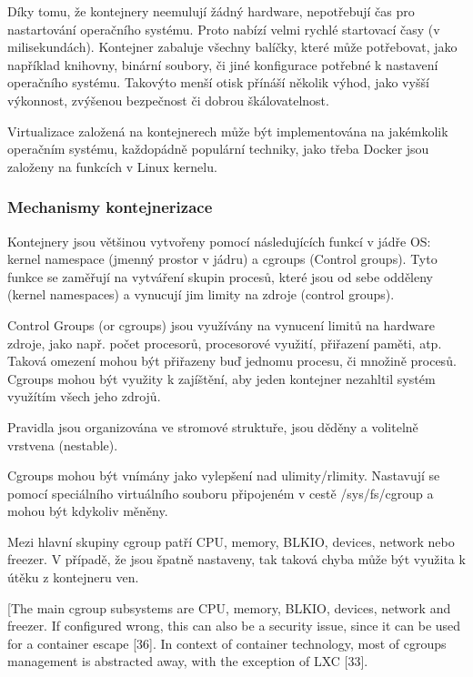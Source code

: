 \documentclass[thesis=M,czech]{FITthesis}[2019/12/23]
\theoremstyle{plain}
\theoremstyle{definition}
\begin{document}
Díky tomu, že kontejnery neemulují žádný hardware, nepotřebují čas pro nastartování operačního systému. Proto nabízí velmi rychlé startovací časy (v milisekundách). Kontejner zabaluje všechny balíčky, které může potřebovat, jako například knihovny, binární soubory, či jiné konfigurace potřebné k nastavení operačního systému. Takovýto menší otisk přínáší několik výhod, jako vyšší výkonnost, zvýšenou bezpečnost či dobrou škálovatelnost.

Virtualizace založená na kontejnerech může být implementována na jakémkolik operačním systému, každopádně populární techniky, jako třeba Docker jsou založeny na funkcích v Linux kernelu. 


\subsubsection{Mechanismy kontejnerizace}

Kontejnery jsou většinou vytvořeny pomocí následujících funkcí v jádře OS: kernel namespace (jmenný prostor v jádru) a cgroups (Control groups). Tyto funkce se zaměřují na vytváření skupin procesů, které jsou od sebe odděleny (kernel namespaces) a vynucují jim limity na zdroje (control groups).


Control Groups (or cgroups) jsou využívány na vynucení limitů na hardware zdroje, jako např. počet procesorů, procesorové využití, přiřazení paměti, atp. Taková omezení mohou být přiřazeny buď jednomu procesu, či množině procesů. Cgroups mohou být využity k zajíštění, aby jeden kontejner nezahltil systém využítím všech jeho zdrojů. 

Pravidla jsou organizována ve stromové struktuře, jsou děděny a volitelně vrstvena (nestable).

Cgroups mohou být vnímány jako vylepšení nad ulimity/rlimity. Nastavují se pomocí speciálního virtuálního souboru připojeném v cestě /sys/fs/cgroup a mohou být kdykoliv měněny.

Mezi hlavní skupiny cgroup patří CPU, memory, BLKIO, devices, network nebo freezer. V případě, že jsou špatně nastaveny, tak taková chyba může být využita k útěku z kontejneru ven. 

[The main cgroup subsystems are CPU, memory, BLKIO,
devices, network and freezer. If configured wrong, this can also be a security issue, since
it can be used for a container escape [36]. In context of container technology, most of
cgroups management is abstracted away, with the exception of LXC [33].
\end{document}
